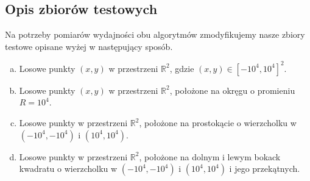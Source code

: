 \subsection{Opis zbiorów testowych}
\quad Na potrzeby pomiarów wydajności obu algorytmów zmodyfikujemy nasze zbiory testowe 
opisane wyżej w następujący sposób.
\begin{enumerate}[a)]
    \item Losowe punkty $(x, y)$ w przestrzeni $\mathbb{R}^2$, gdzie $(x, y) \in \left[-10^4,10^4\right]^{2}$.
    \item Losowe punkty $(x, y)$ w przestrzeni $\mathbb{R}^2$, położone na okręgu o promieniu $R = 10^4$.
    \item Losowe punkty w przestrzeni $\mathbb{R}^2$, 
    położone na prostokącie o wierzcholku w $(-10^4, -10^4)$ i $(10^4, 10^4)$.
    \item Losowe punkty w przestrzeni $\mathbb{R}^2$, 
    położone na dolnym i lewym bokack kwadratu o wierzcholku w $(-10^4, -10^4)$ i $(10^4, 10^4)$ i jego przekątnych.
\end{enumerate}
